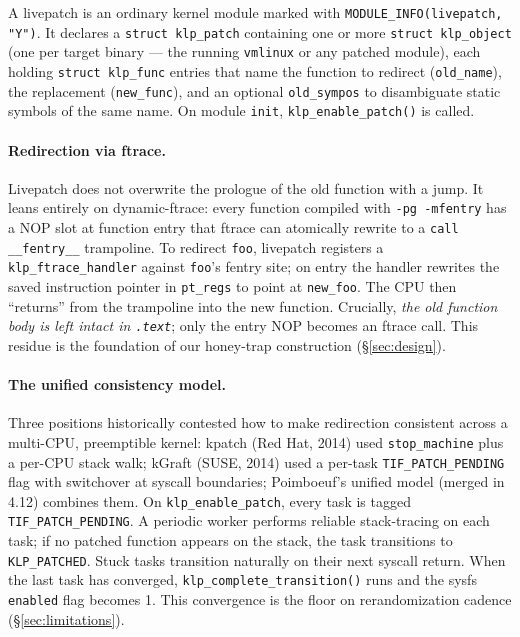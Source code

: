\documentclass[10pt,letterpaper]{article}
\begin{document}
A livepatch is an ordinary kernel module marked with
\texttt{MODULE\_INFO(livepatch, "Y")}. It declares a
\texttt{struct klp\_patch} containing one or more
\texttt{struct klp\_object} (one per target binary --- the running
\texttt{vmlinux} or any patched module), each holding
\texttt{struct klp\_func} entries that name the function to redirect
(\texttt{old\_name}), the replacement (\texttt{new\_func}), and an
optional \texttt{old\_sympos} to disambiguate static symbols of the
same name. On module \texttt{init}, \texttt{klp\_enable\_patch()}
is called.

\paragraph{Redirection via ftrace.} Livepatch does not overwrite the
prologue of the old function with a jump. It leans entirely on
dynamic-ftrace: every function compiled with \texttt{-pg -mfentry}
has a NOP slot at function entry that ftrace can atomically rewrite
to a \texttt{call \_\_fentry\_\_} trampoline. To redirect
\texttt{foo}, livepatch registers a \texttt{klp\_ftrace\_handler}
against \texttt{foo}'s fentry site; on entry the handler rewrites
the saved instruction pointer in \texttt{pt\_regs} to point at
\texttt{new\_foo}. The CPU then ``returns'' from the trampoline into
the new function. Crucially, \emph{the old function body is left
intact in \texttt{.text}}; only the entry NOP becomes an ftrace call.
This residue is the foundation of our honey-trap construction
(\S\ref{sec:design}).

\paragraph{The unified consistency model.} Three positions historically
contested how to make redirection consistent across a multi-CPU,
preemptible kernel: kpatch (Red Hat, 2014) used
\texttt{stop\_machine} plus a per-CPU stack walk; kGraft (SUSE, 2014)
used a per-task \texttt{TIF\_PATCH\_PENDING} flag with switchover at
syscall boundaries; Poimboeuf's unified model
\cite{poimboeuf_consistency} (merged in 4.12) combines them. On
\texttt{klp\_enable\_patch}, every task is tagged
\texttt{TIF\_PATCH\_PENDING}. A periodic worker performs reliable
stack-tracing on each task; if no patched function appears on the
stack, the task transitions to \texttt{KLP\_PATCHED}. Stuck tasks
transition naturally on their next syscall return. When the last
task has converged, \texttt{klp\_complete\_transition()} runs and
the sysfs \texttt{enabled} flag becomes 1. This convergence is the
floor on rerandomization cadence (\S\ref{sec:limitations}).
\end{document}

